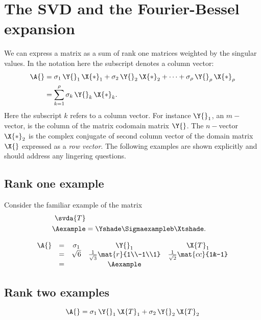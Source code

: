 \section{The SVD and the Fourier-Bessel expansion}

We can express a matrix as a sum of rank one matrices weighted by the singular values. In the notation here the subscript denotes a column vector:
\begin{equation}
  \begin{split}
  \A{} &= \sigma_{1}\, \Y{}_{1}\, \X{*}_{1} + \sigma_{2}\, \Y{}_{2}\, \X{*}_{2} + \dots + \sigma_{\rho}\, \Y{}_{\rho}\, \X{*}_{\rho}\\
    &=\sum_{k=1}^{\rho}{\sigma_{k}\, \Y{}_{k}\, \X{*}_{k}}.
  \end{split}
\end{equation}
Here the subscript $k$ refers to a column vector. For instance $\Y{}_{1}$, an $m-$vector, is the column of the matrix codomain matrix $\Y{}$. The $n-$vector $\X{*}_{2}$ is the complex conjugate of second column vector of the domain matrix $\X{}$ expressed as a \textit{row vector}. The following examples are shown explicitly and should address any lingering questions.

\subsection{Rank one example}
Consider the familiar example of the matrix
\begin{equation}
  \begin{split}
    \svda{T}\\
    \Aexample &=\Yshade \Sigmaexampleb \Xtshade.
  \end{split}
\end{equation}

\begin{equation}
  \begin{array}{rcccc}
    \A{}&=&\sigma_{1} & \Y{}_{1} & \X{T}_{1}\\
      &=& \sqrt{6} & \frac{1}{\sqrt{3}}\mat{r}{1\\-1\\1} & \frac{1}{\sqrt{2}}\mat{cc}{1&-1}\\
      &=&& \Aexample
  \end{array}
\end{equation}

\subsection{Rank two examples}
\begin{equation}
 \A{} = \sigma_{1}\, \Y{}_{1}\, \X{T}_{1} + \sigma_{2}\, \Y{}_{2}\, \X{T}_{2}
\end{equation}


